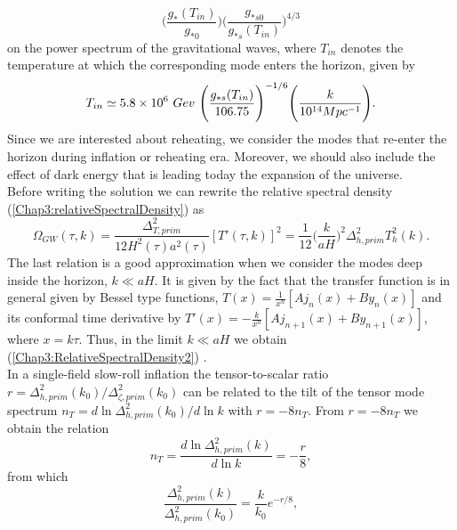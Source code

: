 \documentclass[11pt,a4paper,twoside]{book}
\begin{document}
\begin{equation}
	\label{Chap3:dampingFactorDOF}
	\Bigg (\frac{g_{*}(T_{in})}{g_{*0}} \Bigg)\Bigg (\frac{g_{*s0}}{g_{*s}(T_{in})}\Bigg)^{4/3}
\end{equation}
on the power spectrum of the gravitational waves, where $ T_{in} $ denotes the temperature at which the corresponding mode enters the horizon, given by \cite{Chap3:ProibingReheatingTemperature2008}
\begin{equation}
	\label{T_{in}}
	T_{in} \simeq 5.8 \times 10^{6}\ Gev\ \Bigg (\frac{g_{*s}(T_{in})}{106.75}\Bigg)^{-1/6} \Bigg (\frac{k}{10^{14}Mpc^{-1}} \Bigg).
\end{equation}
Since we are interested about reheating, we consider the modes that re-enter the horizon during inflation or reheating era. Moreover, we should also include the effect of dark energy that is leading today the expansion of the universe. \\
 Before writing the solution we can rewrite the relative spectral density (\ref{Chap3:relativeSpectralDensity}) as
\begin{equation}
	\label{Chap3:RelativeSpectralDensity2}
	\Omega_{GW}(\tau,k) = \frac{\Delta_{T,prim}^{2}}{12H^{2}(\tau)a^{2}(\tau)}[T'(\tau,k)]^{2} = \frac{1}{12}\Bigg (\frac{k}{aH}\Bigg)^{2}\Delta_{h,prim}^{2}T^{2}_{h}(k).
\end{equation}
The last relation is a good approximation when we consider the modes deep inside the horizon, $ k \ll aH $. It is given by the fact  that the transfer function  is in general given by Bessel type functions, $ T(x) = \frac{1}{x^{n}}[Aj_{n}(x) + By_{n}(x)] $ and its conformal time derivative by $ T'(x) = -\frac{k}{x^{n}}[Aj_{n+1}(x) + By_{n+1}(x)] $, where $ x=k\tau $. Thus, in the limit $ k\ll aH $ we obtain (\ref{Chap3:RelativeSpectralDensity2}) \cite{Chap3:GW_Watanabe_Komatsu}.\\
In a single-field slow-roll inflation the tensor-to-scalar ratio $ r = \Delta_{h,prim}^{2}(k_{0})/\Delta_{\zeta,prim}^{2}(k_{0}) $ can be related to the tilt of the tensor mode spectrum $ n_{T} = d \ln \Delta_{h,prim}^{2}(k_{0})/d \ln k  $ with $ r=-8n_{T} $. From $ r= - 8n_{T} $ we obtain the relation
\begin{equation}
	\label{Chap3:consistencyRelation}
	n_{T}=\frac{d \ln \Delta_{h,prim}^{2}(k)}{d \ln k} = -\frac{r}{8},
\end{equation}
from which
\begin{equation}
	\label{Chap3:ConsistencyRelation2}
	\frac{\Delta_{h,prim}^{2}(k)}{\Delta^{2}_{h,prim}(k_{0})} = \frac{k}{k_{0}}e^{-r/8},
\end{equation}
\end{document}
